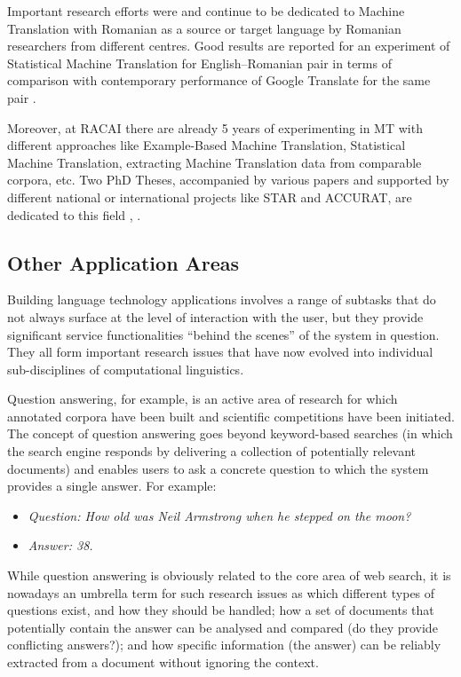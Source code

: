 \begin{multicols}{2}

Important research efforts were and continue to be dedicated to Machine Translation with Romanian as a source or target language by Romanian researchers from different centres. Good results are reported for an experiment of Statistical Machine Translation for English--Romanian pair in terms of comparison with contemporary performance of Google Translate for the same pair \cite{munteanu}. 

Moreover, at RACAI there are already 5 years of experimenting in MT with different approaches like Example-Based Machine Translation, Statistical Machine Translation, extracting Machine Translation data from comparable corpora, etc. Two PhD Theses, accompanied by various papers and supported by different national or international projects like STAR and ACCURAT, are dedicated to this field \cite{tufisMT}, \cite{irimia}.
 
\subsection{Other Application Areas}

Building language technology applications involves a range of subtasks that do not always surface at the level of interaction with the user, but they provide significant service functionalities “behind the scenes” of the system in question. They all form important research issues that have now evolved into individual sub-disciplines of computational linguistics.  

Question answering, for example, is an active area of research for which annotated corpora have been built and scientific competitions have been initiated. The concept of question answering goes beyond keyword-based searches (in which the search engine responds by delivering a collection of potentially relevant documents) and enables users to ask a concrete question to which the system provides a single answer. For example:

\begin{itemize}
\item[] \textit{Question: How old was Neil Armstrong when he stepped on the moon?}
\item[] \textit{Answer: 38.}
\end{itemize}

While question answering is obviously related to the core area of web search, it is nowadays an umbrella term for such research issues as which different types of questions exist, and how they should be handled; how a set of documents that potentially contain the answer can be analysed and compared (do they provide conflicting answers?); and how specific information (the answer) can be reliably extracted from a document without ignoring the context. 


\end{multicols}
